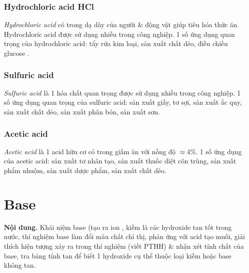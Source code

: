 \documentclass{article}
\begin{document}
\subsubsection{Hydrochloric acid HCl}
\textit{Hydrochloric acid} có trong dạ dày của người \& động vật giúp tiêu hóa thức ăn. Hydrochloric acid được sử dụng nhiều trong công nghiệp. 1 số ứng dụng quan trọng của hydrochloric acid: tẩy rửa kim loại, sản xuất chất dẻo, điều chiếu glucose .

\subsubsection{Sulfuric acid }
\textit{Sulfuric acid} là 1 hóa chất quan trọng được sử dụng nhiều trong công nghiệp. 1 số ứng dụng quan trọng của sulfuric acid: sản xuất giấy, tơ sợi, sản xuất ắc quy, sản xuất chất dẻo, sản xuất phân bón, sản xuất sơn.

\subsubsection{Acetic acid }
\textit{Acetic acid} là 1 acid hữu cơ có trong giấm ăn với nồng độ $\approx4$\%. 1 số ứng dụng của acetic acid: sản xuất tơ nhân tạo, sản xuất thuốc diệt côn trùng, sản xuất phẩm nhuộm, sản xuất dược phẩm, sản xuất chất dẻo.

\noindent{}


\section{Base}
\textsf{\textbf{Nội dung.} Khái niệm base (tạo ra ion , kiềm là các hydroxide tan tốt trong nước, thí nghiệm base làm đổi màu chất chỉ thị, phản ứng với acid tạo muối, giải thích hiện tượng xảy ra trong thí nghiệm (viết PTHH) \& nhận xét tính chất của base, tra bảng tính tan để biết 1 hydroxide cụ thể thuộc loại kiềm hoặc base không tan.}
\end{document}
